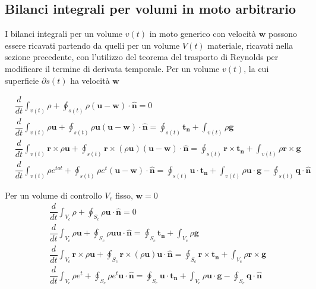 \subsection{Bilanci integrali per volumi in moto arbitrario}
I bilanci integrali per un volume $v(t)$ in moto generico con velocità
 $\bm{w}$ possono essere ricavati partendo da quelli per un volume $V(t)$
 materiale, ricavati nella
 sezione precedente, con l'utilizzo del teorema del trasporto di Reynolds per
 modificare il termine di derivata temporale. Per un volume $v(t)$, la cui
 superficie $\partial s(t)$ ha velocità $\bm{w}$

\begin{equation}\label{eqn:bilanciIntegrali:ale}
 \begin{aligned}
 & \dfrac{d}{d t} \int_{v(t)} \rho + \oint_{s(t)} \rho (\bm{u} - \bm{w}) \cdot \bm{\hat{n}} = 0  \\
 & \dfrac{d}{d t} \int_{v(t)} \rho \bm{u} + \oint_{s(t)} \rho \bm{u} (\bm{u} - \bm{w}) \cdot \bm{\hat{n}} =
     \oint_{s(t)} \bm{t_n} + \int_{v(t)} \rho \bm{g} \\
 & \dfrac{d}{d t} \int_{v(t)} \bm{r} \times \rho \bm{u} + \oint_{s(t)} \bm{r} \times (\rho \bm{u}) (\bm{u} - \bm{w}) \cdot \bm{\hat{n}} = 
    \oint_{s(t)} \bm{r} \times \bm{t_n} + \int_{v(t)} \rho \bm{r} \times \bm{g} \\
 & \dfrac{d}{d t} \int_{v(t)} \rho e^{tot} + \oint_{s(t)} \rho e^t (\bm{u} - \bm{w}) \cdot \bm{\hat{n}}
  = \oint_{s(t)} \bm{u} \cdot \bm{t_n} + \int_{v(t)} \rho \bm{u} \cdot \bm{g}
  - \oint_{s(t)} \bm{q} \cdot \bm{\hat{n}}
 \end{aligned}
\end{equation}

\noindent
Per un volume di controllo $V_c$ fisso, $\bm{w}=0$
\begin{equation}\label{eqn:bilanciIntegrali:eulerian}
 \begin{aligned}
 & \dfrac{d}{d t} \int_{V_c} \rho + \oint_{S_c} \rho \bm{u} \cdot \bm{\hat{n}} = 0  \\
 & \dfrac{d}{d t} \int_{V_c} \rho \bm{u} + \oint_{S_c} \rho \bm{u} \bm{u} \cdot \bm{\hat{n}} =
     \oint_{S_c} \bm{t_n} + \int_{V_c} \rho \bm{g} \\
 & \dfrac{d}{d t} \int_{V_c} \bm{r} \times \rho \bm{u} + \oint_{S_c} \bm{r} \times (\rho \bm{u}) \bm{u} \cdot \bm{\hat{n}} = 
    \oint_{S_c} \bm{r} \times \bm{t_n} + \int_{V_c} \rho \bm{r} \times \bm{g} \\
 & \dfrac{d}{d t} \int_{V_c} \rho e^t + \oint_{S_c} \rho e^t \bm{u} \cdot \bm{\hat{n}}
  = \oint_{S_c} \bm{u} \cdot \bm{t_n} + \int_{V_c} \rho \bm{u} \cdot \bm{g}
  - \oint_{S_c} \bm{q} \cdot \bm{\hat{n}}
 \end{aligned}
\end{equation}


